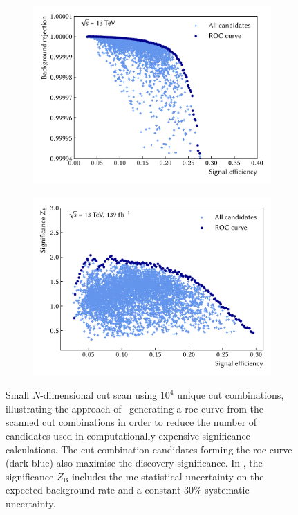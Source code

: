  \begin{figure}
	\centering
	\begin{subfigure}[b]{0.5\linewidth}
		\centering\includegraphics[width=1.0\textwidth]{N-1_cut_scan/roc_curve_thesis_plots}
		\caption{\label{fig:roc_curve}}
	\end{subfigure}\hfill
	\begin{subfigure}[b]{0.5\linewidth}
		\centering\includegraphics[width=1.0\textwidth]{N-1_cut_scan/z_vs_effs_thesis_plots}
		\caption{\label{fig:z_vs_eff}}
	\end{subfigure}\hfill

	\caption{Small $N$-dimensional cut scan using $10^4$ unique cut combinations, illustrating the approach of~ generating a \gls{roc} curve from the scanned cut combinations in order to  reduce the number of candidates used in computationally expensive significance calculations. The cut combination candidates forming the \gls{roc} curve (dark blue) also maximise the discovery significance. In , the significance $Z_\mathrm{B}$ includes the \gls{mc} statistical uncertainty on the expected background rate and a constant 30\% systematic uncertainty.} 
	\label{fig:ahoi_examples}
\end{figure}

